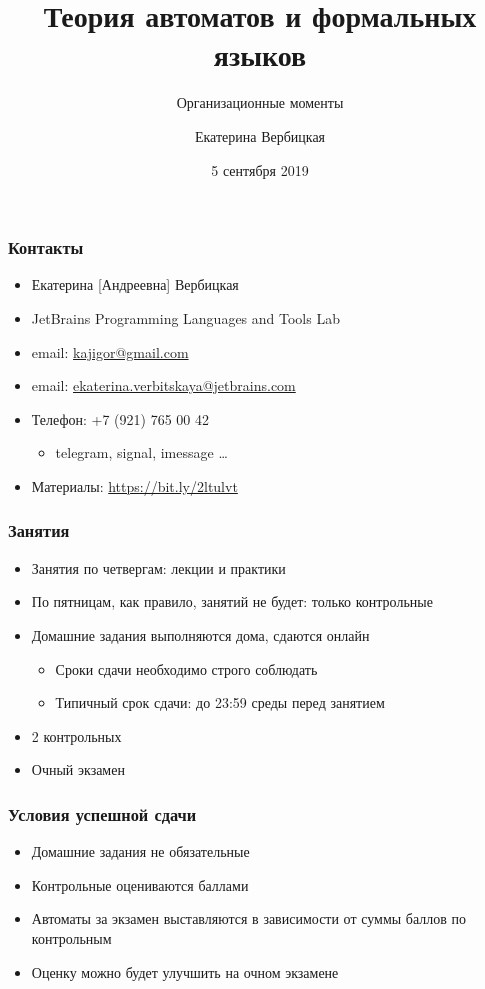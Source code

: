 \documentclass{beamer}
\title[]{Теория автоматов и формальных языков}
\subtitle[]{Организационные моменты}
\institute[]{
Санкт-Петербургский государственный электротехнический университет <<ЛЭТИ>>\\
}
\author[]{Екатерина Вербицкая}
\date{5 сентября 2019}
\begin{document}
{
\begin{frame}
  \titlepage
\end{frame}

}

\begin{frame}[fragile]
  \transwipe[direction=90]
  \frametitle{Контакты}
  \begin{itemize}
    \item Екатерина [Андреевна] Вербицкая
    \item JetBrains Programming Languages and Tools Lab 
    \item email: \href{mailto:kajigor@gmail.com}{kajigor@gmail.com}
    \item email: \href{mailto:ekaterina.verbitskaya@jetbrains.com}{ekaterina.verbitskaya@jetbrains.com} 
    \item Телефон: +7 (921) 765 00 42
    \begin{itemize}
      \item telegram, signal, imessage \dots
    \end{itemize}
    \item Материалы: \url{https://bit.ly/2ltulvt}
  \end{itemize}
\end{frame}

\begin{frame}[fragile]
  \transwipe[direction=90]
  \frametitle{Занятия}
  \begin{itemize}
    \item Занятия по четвергам: лекции и практики
    \item По пятницам, как правило, занятий не будет: только контрольные
    \item Домашние задания выполняются дома, сдаются онлайн
    \begin{itemize}
      \item Сроки сдачи необходимо строго соблюдать
      \item Типичный срок сдачи: до 23:59 среды перед занятием
    \end{itemize}
    \item 2 контрольных
    \item Очный экзамен
  \end{itemize}
\end{frame}

\begin{frame}[fragile]
  \transwipe[direction=90]
  \frametitle{Условия успешной сдачи}
  \begin{itemize}
    \item Домашние задания не обязательные
    \item Контрольные оцениваются баллами
    \item Автоматы за экзамен выставляются в зависимости от суммы баллов по контрольным
  \end{itemize}
  \begin{itemize}
    \item Оценку можно будет улучшить на очном экзамене
  \end{itemize}
\end{frame}
\end{document}
